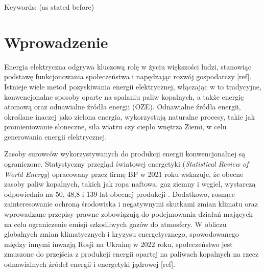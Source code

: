 \documentclass{amuthesis}
\begin{document}
Keywords: (as stated before)

\newpage

\sf\tighttoc\doublespacing


\hypertarget{sec-wprowadzenie}{%
\chapter{Wprowadzenie}\label{sec-wprowadzenie}}

Energia elektryczna odgrywa kluczową rolę w życiu większości ludzi,
stanowiąc podstawę funkcjonowania społeczeństwa i napędzając rozwój
gospodarczy {[}ref{]}. Istnieje wiele metod pozyskiwania energii
elektrycznej, włączając w to tradycyjne, konwencjonalne sposoby oparte
na spalaniu paliw kopalnych, a także energię atomową oraz odnawialne
źródła energii (OZE). Odnawialne źródła energii, określane inaczej jako
zielona energia, wykorzystują naturalne procesy, takie jak
promieniowanie słoneczne, siła wiatru czy ciepło wnętrza Ziemi, w celu
generowania energii elektrycznej.

Zasoby surowców wykorzystywanych do produkcji energii konwencjonalnej są
ograniczone. Statystyczny przegląd światowej energetyki
(\emph{Statistical Review of World Energy}) opracowany przez firmę BP w
2021 roku wskazuje, że obecne zasoby paliw kopalnych, takich jak ropa
naftowa, gaz ziemny i węgiel, wystarczą odpowiednio na 50, 48,8 i 139
lat obecnej produkcji \autocite{bp_2021_world_energy}. Dodatkowo,
rosnące zainteresowanie ochroną środowiska i negatywnymi skutkami zmian
klimatu oraz wprowadzane przepisy prawne zobowiązują do podejmowania
działań mających na celu ograniczenie emisji szkodliwych gazów do
atmosfery. W obliczu globalnych zmian klimatycznych i kryzysu
energetycznego, spowodowanego między innymi inwazją Rosji na Ukrainę w
2022 roku, społeczeństwo jest zmuszone do przejścia z produkcji energii
opartej na paliwach kopalnych na rzecz odnawialnych źródeł energii i
energetyki jądrowej {[}ref{]}.
\end{document}

